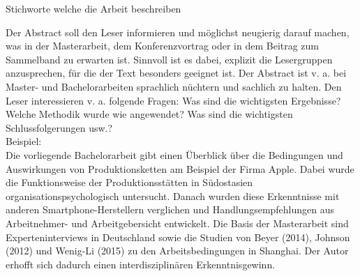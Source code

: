 \thispagestyle{empty}

Stichworte welche die Arbeit beschreiben

Der Abstract soll den Leser informieren und möglichst neugierig darauf machen, was in der Masterarbeit, dem Konferenzvortrag oder in dem Beitrag zum Sammelband zu erwarten ist. Sinnvoll ist es dabei, explizit die Lesergruppen anzusprechen, für die der Text besonders geeignet ist. Der Abstract ist v. a. bei Master- und Bachelorarbeiten sprachlich nüchtern und sachlich zu halten. Den Leser interessieren v. a. folgende Fragen: Was sind die wichtigsten Ergebnisse? Welche Methodik wurde wie angewendet? Was sind die wichtigsten Schlussfolgerungen usw.?\\

Beispiel:\\
Die vorliegende Bachelorarbeit gibt einen Überblick über die Bedingungen und Auswirkungen von Produktionsketten am Beispiel der Firma Apple. Dabei wurde die Funktionsweise der Produktionsstätten in Südostasien organisationspsychologisch untersucht. Danach wurden diese Erkenntnisse mit anderen Smartphone-Herstellern verglichen und Handlungsempfehlungen aus Arbeitnehmer- und Arbeitgebersicht entwickelt. Die Basis der Masterarbeit sind Experteninterviews in Deutschland sowie die Studien von Beyer (2014), Johnson (2012) und Wenig-Li (2015) zu den Arbeitsbedingungen in Shanghai. Der Autor erhofft sich dadurch einen interdisziplinären Erkenntnisgewinn.

